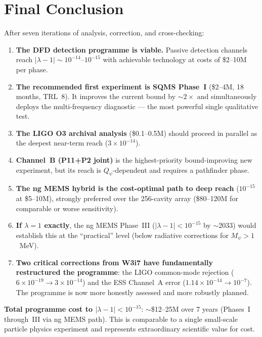 \documentclass[11pt]{article}
\newcommand{\lam}{\lambda}
\newcommand{\ee}[1]{\times 10^{#1}}
\newcommand{\Qpsi}{Q_\psi}
\newcommand{\lbone}{|\lam - 1|}
\theoremstyle{definition}
\theoremstyle{remark}
\begin{document}
\section{Final Conclusion}
\label{sec:conclusion}

\begin{tcolorbox}[colback=green!5!white, colframe=green!60!black,
  title=\textbf{W3i8 DEFINITIVE CONCLUSION}]

After seven iterations of analysis, correction, and cross-checking:

\begin{enumerate}
\item \textbf{The DFD detection programme is viable.} Passive detection
  channels reach $\lbone \sim 10^{-14}$--$10^{-15}$ with achievable
  technology at costs of \$2--10M per phase.

\item \textbf{The recommended first experiment is SQMS Phase~I}
  (\$2--4M, 18 months, TRL~8). It improves the current bound by
  $\sim 2\times$ and simultaneously deploys the multi-frequency
  diagnostic --- the most powerful single qualitative test.

\item \textbf{The LIGO O3 archival analysis} (\$0.1--0.5M) should
  proceed in parallel as the deepest near-term reach ($3\ee{-14}$).

\item \textbf{Channel~B (P11+P2 joint)} is the highest-priority
  bound-improving new experiment, but its reach is
  $\Qpsi$-dependent and requires a pathfinder phase.

\item \textbf{The ng MEMS hybrid is the cost-optimal path to deep
  reach} ($10^{-15}$ at \$5--10M), strongly preferred over the
  256-cavity array (\$80--120M for comparable or worse sensitivity).

\item \textbf{If $\lambda = 1$ exactly}, the ng MEMS Phase~III
  ($\lbone < 10^{-15}$ by $\sim$2033) would establish this at the
  ``practical'' level (below radiative corrections for
  $M_\psi > 1$~MeV).

\item \textbf{Two critical corrections from W3i7 have fundamentally
  restructured the programme}: the LIGO common-mode rejection
  ($6\ee{-19} \to 3\ee{-14}$) and the ESS Channel~A error
  ($1.14\ee{-14} \to 10^{-7}$). The programme is now more
  honestly assessed and more robustly planned.
\end{enumerate}

\textbf{Total programme cost to $\lbone < 10^{-15}$}:
$\sim$\$12--25M over 7 years (Phases~I through~III via ng MEMS path).
This is comparable to a single small-scale particle physics experiment
and represents extraordinary scientific value for cost.
\end{tcolorbox}
\end{document}
